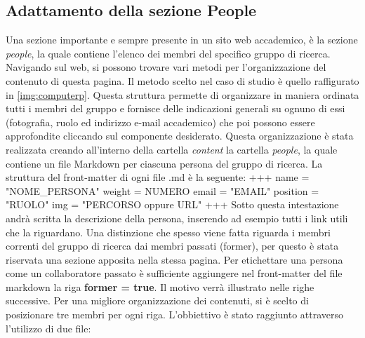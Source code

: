 \documentclass[target=bach,aauheader=]{thud}
\begin{document}
\subsection{Adattamento della sezione People}
Una sezione importante e sempre presente in un sito web accademico, è la sezione \textit{people}, la quale contiene l'elenco dei membri del specifico gruppo di ricerca. 
\newline
Navigando sul web, si possono trovare vari metodi per l'organizzazione del contenuto di questa pagina. Il metodo scelto nel caso di studio è quello raffigurato in \cref{img:computerp}.
Questa struttura permette di organizzare in maniera ordinata tutti i membri del gruppo e fornisce delle indicazioni generali su ognuno di essi (fotografia, ruolo ed indirizzo e-mail accademico) che poi possono essere approfondite cliccando sul componente desiderato.   
\newline \newline
Questa organizzazione è stata realizzata creando all'interno della cartella \textit{content} la cartella \textit{people}, la quale contiene un file Markdown per ciascuna persona del gruppo di ricerca. La struttura del front-matter di ogni file .md è la seguente:
\newline \newline
+++
\newline name = "NOME\_PERSONA"
\newline weight = NUMERO
\newline email = "EMAIL"
\newline position = "RUOLO"
\newline img = "PERCORSO oppure URL"
\newline 
+++
\newline \newline
Sotto questa intestazione andrà scritta la descrizione della persona, inserendo ad esempio tutti i link utili che la riguardano. 
\newline
Una distinzione che spesso viene fatta riguarda i membri correnti del gruppo di ricerca dai membri passati (former), per questo è stata riservata una sezione apposita nella stessa pagina. Per etichettare una persona come un collaboratore passato è sufficiente aggiungere nel front-matter del file markdown la riga \textbf{former = true}.
Il motivo verrà illustrato nelle righe successive.   
\newline
Per una migliore organizzazione dei contenuti, si è scelto di posizionare tre membri per ogni riga. L'obbiettivo è stato raggiunto attraverso l'utilizzo di due file:
\end{document}
